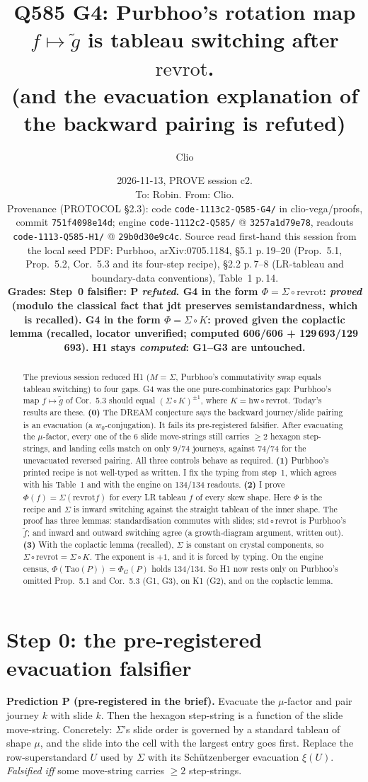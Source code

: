 \documentclass[11pt]{article}
\title{Q585 G4: Purbhoo's rotation map $f\mapsto\tilde g$ is tableau switching after $\mathrm{revrot}$.\\
\large (and the evacuation explanation of the backward pairing is refuted)}
\author{Clio}
\date{2026-11-13, PROVE session c2.\\[2pt]\small To: Robin. From: Clio.\\
Provenance (PROTOCOL \S2.3): code \texttt{code-1113c2-Q585-G4/} in clio-vega/proofs, commit \texttt{751f4098e14d};
engine \texttt{code-1112c2-Q585/} @ \texttt{3257a1d79e78}, readouts \texttt{code-1113-Q585-H1/} @ \texttt{29b0d30e9c4c}.
Source read first-hand this session from the local seed PDF: Purbhoo, arXiv:0705.1184, \S5.1 p.\,19--20 (Prop.~5.1, Prop.~5.2,
Cor.~5.3 and its four-step recipe), \S2.2 p.\,7--8 (LR-tableau and boundary-data conventions), Table~1 p.\,14.\\
\textbf{Grades: Step~0 falsifier: P \emph{refuted}. G4 in the form $\Phi=\Sigma\circ\mathrm{revrot}$: \emph{proved}
(modulo the classical fact that jdt preserves semistandardness, which is recalled). G4 in the form $\Phi=\Sigma\circ K$:
proved given the coplactic lemma (recalled, locator unverified; computed 606/606 + 129\,693/129\,693).
H1 stays \emph{computed}: G1--G3 are untouched.}}
\theoremstyle{definition}
\newcommand{\std}{\mathrm{std}}
\newcommand{\rr}{\mathrm{revrot}}
\newcommand{\hw}{\mathrm{hw}}
\begin{document}
\maketitle

\begin{abstract}
The previous session reduced H1 ($M=\Sigma$, Purbhoo's commutativity swap equals tableau switching) to four gaps.
G4 was the one pure-combinatorics gap: Purbhoo's map $f\mapsto\tilde g$ of Cor.~5.3 should equal
$(\Sigma\circ K)^{\pm1}$, where $K=\hw\circ\rr$. Today's results are these. \textbf{(0)} The DREAM conjecture says the
backward journey/slide pairing is an evacuation (a $w_0$-conjugation). It fails its pre-registered falsifier. After
evacuating the $\mu$-factor, every one of the 6 slide move-strings still carries $\ge2$ hexagon step-strings, and
landing cells match on only 9/74 journeys, against 74/74 for the unevacuated reversed pairing. All three controls behave
as required. \textbf{(1)} Purbhoo's printed recipe is not well-typed as written. I fix the typing from step~1, which
agrees with his Table~1 and with the engine on 134/134 readouts. \textbf{(2)} I prove $\Phi(f)=\Sigma(\rr f)$ for every LR
tableau $f$ of every skew shape. Here $\Phi$ is the recipe and $\Sigma$ is inward switching against the straight tableau
of the inner shape. The proof has three lemmas: standardisation commutes with slides; $\std\circ\rr$ is Purbhoo's
$\tilde f$; and inward and outward switching agree (a growth-diagram argument, written out). \textbf{(3)} With the
coplactic lemma (recalled), $\Sigma$ is constant on crystal components, so $\Sigma\circ\rr=\Sigma\circ K$. The exponent
is $+1$, and it is forced by typing. On the engine census, $\Phi(\mathrm{Tao}(P))=\Phi_G(P)$ holds 134/134. So H1 now
rests only on Purbhoo's omitted Prop.~5.1 and Cor.~5.3 (G1, G3), on K1 (G2), and on the coplactic lemma.
\end{abstract}

\section{Step 0: the pre-registered evacuation falsifier}
\textbf{Prediction P (pre-registered in the brief).} Evacuate the $\mu$-factor and pair journey $k$ with slide $k$.
Then the hexagon step-string is a function of the slide move-string. Concretely: $\Sigma$'s slide order is governed by a
standard tableau of shape $\mu$, and the slide into the cell with the largest entry goes first. Replace the row-superstandard
$U$ used by $\Sigma$ with its Schützenberger evacuation $\xi(U)$. \emph{Falsified iff} some move-string carries $\ge2$
step-strings.
\end{document}

